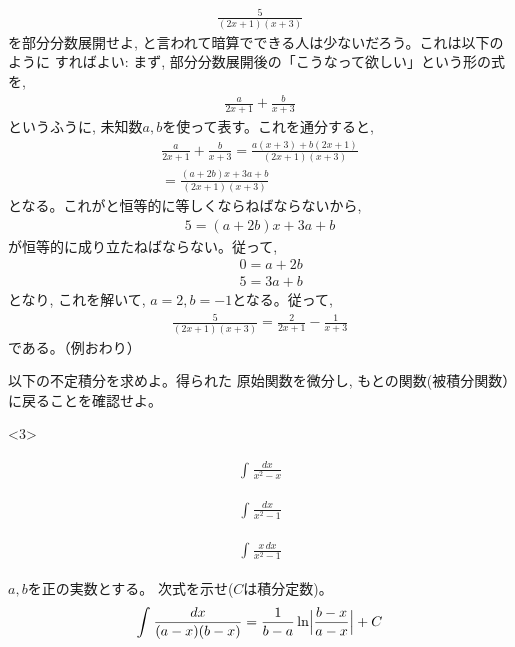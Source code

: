 \begin{exmpl}\label{ex:bubunsekibun10}
\begin{eqnarray}
\frac{5}{(2x+1)(x+3)}\label{ex:bubunsekibun14}
\end{eqnarray}
を部分分数展開せよ, と言われて暗算でできる人は少ないだろう。これは以下のように
すればよい: まず, 部分分数展開後の「こうなって欲しい」という形の式を, 
\begin{eqnarray}
\frac{a}{2x+1}+\frac{b}{x+3}
\end{eqnarray}
というふうに, 未知数$a, b$を使って表す。これを通分すると, 
\begin{eqnarray*}
\frac{a}{2x+1}+\frac{b}{x+3}=\frac{a(x+3)+b(2x+1)}{(2x+1)(x+3)}\\
=\frac{(a+2b)x+3a+b}{(2x+1)(x+3)}
\end{eqnarray*}
となる。これがと恒等的に等しくならねばならないから, 
\begin{eqnarray}
5=(a+2b)x+3a+b
\end{eqnarray}
が恒等的に成り立たねばならない。従って, 
\begin{eqnarray}
&&0=a+2b\\
&&5=3a+b
\end{eqnarray}
となり, これを解いて, $a=2, b=-1$となる。従って, 
\begin{eqnarray}
\frac{5}{(2x+1)(x+3)}=\frac{2}{2x+1}-\frac{1}{x+3}
\end{eqnarray}
である。（例おわり）
\end{exmpl}

\begin{q}\label{q:int_bubunbunsu} 以下の不定積分を求めよ。得られた
原始関数を微分し, もとの関数(被積分関数）に戻ることを確認せよ。
\begin{edaenumerate}<3>
\item \begin{eqnarray*}\int_{}^{} \frac{dx}{x^2-x}\end{eqnarray*}
\item \begin{eqnarray*}\int_{}^{} \frac{dx}{x^2-1}\end{eqnarray*}
\item \begin{eqnarray*}\int_{}^{} \frac{x\,dx}{x^2-1}\end{eqnarray*}
\end{edaenumerate}\end{q}

\begin{q}\label{q:int_bubunbunsu2} $a, b$を正の実数とする。
次式を示せ($C$は積分定数)。
\begin{eqnarray}
\int_{}^{} \frac{dx}{(a-x)(b-x)}=\frac{1}{b-a}\ln\Bigl|\frac{b-x}{a-x}\Bigr|+C
\end{eqnarray}\end{q}
\mv

